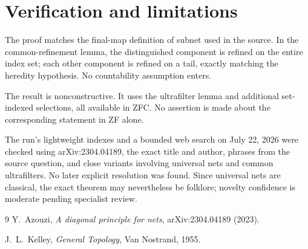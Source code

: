 \documentclass[11pt]{article}
\theoremstyle{definition}
\begin{document}
\section{Verification and limitations}

The proof matches the final-map definition of subnet used in the source.  In
the common-refinement lemma, the distinguished component is refined on the
entire index set; each other component is refined on a tail, exactly matching
the heredity hypothesis.  No countability assumption enters.

The result is nonconstructive.  It uses the ultrafilter lemma and additional
set-indexed selections, all available in ZFC.  No assertion is made about the
corresponding statement in ZF alone.

The run's lightweight indexes and a bounded web search on July 22, 2026 were
checked using arXiv:2304.04189, the exact title and author, phrases from the
source question, and close variants involving universal nets and common
ultrafilters.  No later explicit resolution was found.  Since universal nets
are classical, the exact theorem may nevertheless be folklore; novelty
confidence is moderate pending specialist review.

\begin{thebibliography}{9}
Y.~Azouzi,
\emph{A diagonal principle for nets},
arXiv:2304.04189 (2023).

J.~L.~Kelley,
\emph{General Topology},
Van Nostrand, 1955.
\end{thebibliography}
\end{document}
